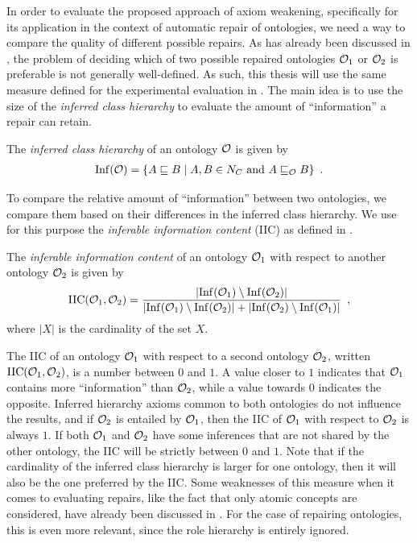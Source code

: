 
In order to evaluate the proposed approach of axiom weakening, specifically for its application in the context of automatic repair of ontologies, we need a way to compare the quality of different possible repairs. As has already been discussed in \cite{troquard2018repairing}, the problem of deciding which of two possible repaired ontologies $\mathcal{O}_1$ or $\mathcal{O}_2$ is preferable is not generally well-defined. As such, this thesis will use the same measure defined for the experimental evaluation in \cite{troquard2018repairing}. The main idea is to use the size of the \emph{inferred class hierarchy} to evaluate the amount of ``information'' a repair can retain.

\begin{definition}\label{def:inf}
  The \emph{inferred class hierarchy} of an ontology $\mathcal{O}$ is given by
  \begin{align*}
    {\ensuremath{\operatorname{Inf}}}(\mathcal{O}) = \{ A \sqsubseteq B \mid A, B \in N_C \text{ and } A \sqsubseteq_\mathcal{O} B \} \enspace.
  \end{align*}
\end{definition}

To compare the relative amount of ``information'' between two ontologies, we compare them based on their differences in the inferred class hierarchy. We use for this purpose the \emph{inferable information content} (IIC) as defined in \cite{troquard2018repairing}.

\begin{definition}\label{def:iic}
  The \emph{inferable information content} of an ontology $\mathcal{O}_1$ with respect to another ontology $\mathcal{O}_2$ is given by
  \begin{align*}
    {\ensuremath{\operatorname{IIC}}}(\mathcal{O}_1, \mathcal{O}_2) = \frac{| {\operatorname{Inf}}(\mathcal{O}_1) \setminus {\ensuremath{\operatorname{Inf}}}(\mathcal{O}_2) |}{|{\operatorname{Inf}}(\mathcal{O}_1) \setminus {\ensuremath{\operatorname{Inf}}}(\mathcal{O}_2)| + |{\operatorname{Inf}}(\mathcal{O}_2) \setminus {\ensuremath{\operatorname{Inf}}}(\mathcal{O}_1)|} \enspace,
  \end{align*}
  where $|X|$ is the cardinality of the set $X$.
\end{definition}

The IIC of an ontology $\mathcal{O}_1$ with respect to a second ontology $\mathcal{O}_2$, written ${\operatorname{IIC}}(\mathcal{O}_1, \mathcal{O}_2)$, is a number between $0$ and $1$. A value closer to $1$ indicates that $\mathcal{O}_1$ contains more ``information'' than $\mathcal{O}_2$, while a value towards $0$ indicates the opposite. Inferred hierarchy axioms common to both ontologies do not influence the results, and if $\mathcal{O}_2$ is entailed by $\mathcal{O}_1$, then the IIC of $\mathcal{O}_1$ with respect to $\mathcal{O}_2$ is always $1$. If both $\mathcal{O}_1$ and $\mathcal{O}_2$ have some inferences that are not shared by the other ontology, the IIC will be strictly between $0$ and $1$. Note that if the cardinality of the inferred class hierarchy is larger for one ontology, then it will also be the one preferred by the IIC. Some weaknesses of this measure when it comes to evaluating repairs, like the fact that only atomic concepts are considered, have already been discussed in \cite{troquard2018repairing}. For the case of repairing \SROIQ ontologies, this is even more relevant, since the role hierarchy is entirely ignored.

